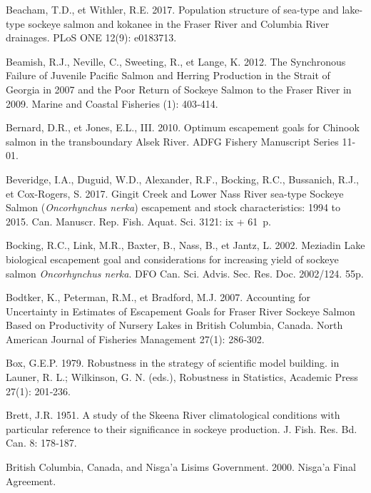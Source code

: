 \documentclass[french,11pt]{book}
\begin{document}
\begin{CSLReferences}{1}{0}
Beacham, T.D., et Withler, R.E. 2017. {Population structure of sea-type and lake-type sockeye salmon and kokanee in the Fraser River and Columbia River drainages}. PLoS ONE 12(9): e0183713.

Beamish, R.J., Neville, C., Sweeting, R., et Lange, K. 2012. {The Synchronous Failure of Juvenile Pacific Salmon and Herring Production in the Strait of Georgia in 2007 and the Poor Return of Sockeye Salmon to the Fraser River in 2009}. Marine and Coastal Fisheries (1): 403‑414.

Bernard, D.R., et Jones, E.L., III. 2010. {Optimum escapement goals for Chinook salmon in the transboundary Alsek River}. ADFG Fishery Manuscript Series 11-01.

Beveridge, I.A., Duguid, W.D., Alexander, R.F., Bocking, R.C., Bussanich, R.J., et Cox-Rogers, S. 2017. {Gingit Creek and Lower Nass River sea-type Sockeye Salmon }(\emph{Oncorhynchus nerka}){ escapement and stock characteristics: 1994 to 2015}. Can. Manuscr. Rep. Fish. Aquat. Sci. 3121: ix + 61~p.

Bocking, R.C., Link, M.R., Baxter, B., Nass, B., et Jantz, L. 2002. Meziadin Lake biological escapement goal and considerations for increasing yield of sockeye salmon \emph{Oncorhynchus nerka}. DFO Can. Sci. Advis. Sec. Res. Doc. 2002/124. 55p.

Bodtker, K., Peterman, R.M., et Bradford, M.J. 2007. {Accounting for Uncertainty in Estimates of Escapement Goals for Fraser River Sockeye Salmon Based on Productivity of Nursery Lakes in British Columbia, Canada}. North American Journal of Fisheries Management 27(1): 286‑302.

Box, G.E.P. 1979. {Robustness in the strategy of scientific model building}. in Launer, R. L.; Wilkinson, G. N. (eds.), Robustness in Statistics, Academic Press 27(1): 201‑236.

Brett, J.R. 1951. {A study of the Skeena River climatological conditions with particular reference to their significance in sockeye production}. J. Fish. Res. Bd. Can. 8: 178‑187.

British Columbia, Canada, and Nisga'a Lisims Government. 2000. {Nisga'a Final Agreement}.


\end{CSLReferences}
\end{document}
